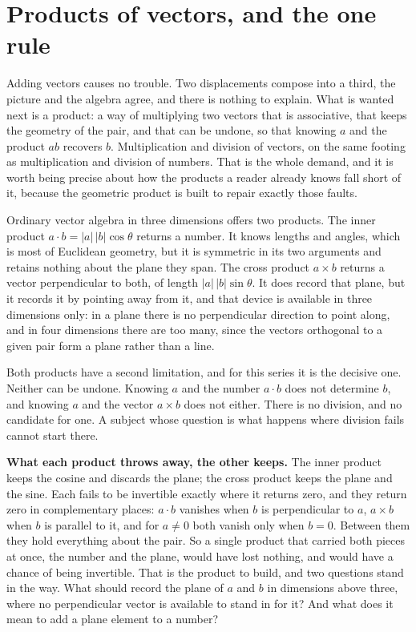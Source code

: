 \documentclass[11pt]{article}
\theoremstyle{definition}
\theoremstyle{plain}
\begin{document}
\section{Products of vectors, and the one rule}

\label{c:note.primer.setting-products-vectors-one-rule}
Adding vectors causes no trouble. Two displacements compose into a third, the picture and the algebra agree, and there is nothing to explain. What is wanted next is a product: a way of multiplying two vectors that is associative, that keeps the geometry of the pair, and that can be undone, so that knowing $a$ and the product $ab$ recovers $b$. Multiplication and division of vectors, on the same footing as multiplication and division of numbers. That is the whole demand, and it is worth being precise about how the products a reader already knows fall short of it, because the geometric product is built to repair exactly those faults.

Ordinary vector algebra in three dimensions offers two products. The inner product $a \cdot b = |a|\,|b| \cos\theta$ returns a number. It knows lengths and angles, which is most of Euclidean geometry, but it is symmetric in its two arguments and retains nothing about the plane they span. The cross product $a \times b$ returns a vector perpendicular to both, of length $|a|\,|b| \sin\theta$. It does record that plane, but it records it by pointing away from it, and that device is available in three dimensions only: in a plane there is no perpendicular direction to point along, and in four dimensions there are too many, since the vectors orthogonal to a given pair form a plane rather than a line.

Both products have a second limitation, and for this series it is the decisive one. Neither can be undone. Knowing $a$ and the number $a \cdot b$ does not determine $b$, and knowing $a$ and the vector $a \times b$ does not either. There is no division, and no candidate for one. A subject whose question is what happens where division fails cannot start there.

\label{c:note.primer.setting-products-vectors-one-rule-2}
\textbf{What each product throws away, the other keeps.} The inner product keeps the cosine and discards the plane; the cross product keeps the plane and the sine. Each fails to be invertible exactly where it returns zero, and they return zero in complementary places: $a \cdot b$ vanishes when $b$ is perpendicular to $a$, $a \times b$ when $b$ is parallel to it, and for $a \neq 0$ both vanish only when $b = 0$. Between them they hold everything about the pair. So a single product that carried both pieces at once, the number and the plane, would have lost nothing, and would have a chance of being invertible. That is the product to build, and two questions stand in the way. What should record the plane of $a$ and $b$ in dimensions above three, where no perpendicular vector is available to stand in for it? And what does it mean to add a plane element to a number?
\end{document}
